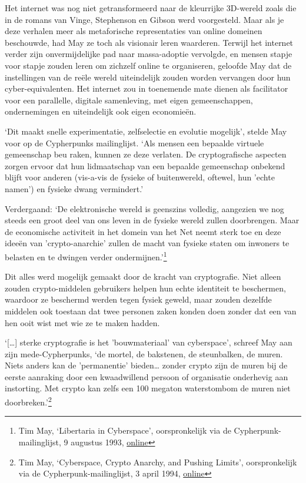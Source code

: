 \documentclass[
  a5paper,
  smalldemyvopaper,11pt,twoside,onecolumn,openright,extrafontsizes]{memoir}
\begin{document}
Het internet was nog niet getransformeerd naar de kleurrijke 3D-wereld
zoals die in de romans van Vinge, Stephenson en Gibson werd voorgesteld.
Maar als je deze verhalen meer als metaforische representaties van
online domeinen beschouwde, had May ze toch als visionair leren
waarderen. Terwijl het internet verder zijn onvermijdelijke pad naar
massa-adoptie vervolgde, en mensen stapje voor stapje zouden leren om
zichzelf online te organiseren, geloofde May dat de instellingen van de
reële wereld uiteindelijk zouden worden vervangen door hun
cyber-equivalenten. Het internet zou in toenemende mate dienen als
facilitator voor een parallelle, digitale samenleving, met eigen
gemeenschappen, ondernemingen en uiteindelijk ook eigen economieën.

`Dit maakt snelle experimentatie, zelfselectie en evolutie mogelijk',
stelde May voor op de Cypherpunks mailinglijst. `Als mensen een bepaalde
virtuele gemeenschap beu raken, kunnen ze deze verlaten. De
cryptografische aspecten zorgen ervoor dat hun lidmaatschap van een
bepaalde gemeenschap onbekend blijft voor anderen (vis-a-vis de fysieke
of buitenwereld, oftewel, hun 'echte namen') en fysieke dwang
vermindert.'

Verdergaand: `De elektronische wereld is geenszins volledig, aangezien
we nog steeds een groot deel van ons leven in de fysieke wereld zullen
doorbrengen. Maar de economische activiteit in het domein van het Net
neemt sterk toe en deze ideeën van 'crypto-anarchie' zullen de macht van
fysieke staten om inwoners te belasten en te dwingen verder
ondermijnen.'\footnote{Tim May, `Libertaria in Cyberspace',
  oorspronkelijk via de Cypherpunk-mailinglijst, 9 augustus 1993,
  \href{https://cypherpunks.venona.com/date/1993/08/msg00168.html}{online}}

Dit alles werd mogelijk gemaakt door de kracht van cryptografie. Niet
alleen zouden crypto-middelen gebruikers helpen hun echte identiteit te
beschermen, waardoor ze beschermd werden tegen fysiek geweld, maar
zouden dezelfde middelen ook toestaan dat twee personen zaken konden
doen zonder dat een van hen ooit wist met wie ze te maken hadden.

`{[}\ldots{]} sterke cryptografie is het 'bouwmateriaal' van
cyberspace', schreef May aan zijn mede-Cypherpunks, `de mortel, de
bakstenen, de steunbalken, de muren. Niets anders kan de 'permanentie'
bieden\ldots{} zonder crypto zijn de muren bij de eerste aanraking door
een kwaadwillend persoon of organisatie onderhevig aan instorting. Met
crypto kan zelfs een 100 megaton waterstombom de muren niet
doorbreken.'\footnote{Tim May, `Cyberspace, Crypto Anarchy, and Pushing
  Limits', oorspronkelijk via de Cypherpunk-mailinglijst, 3 april 1994,
  \href{https://cypherpunks.venona.com/date/1994/04/msg00096.html}{online}}
\end{document}

